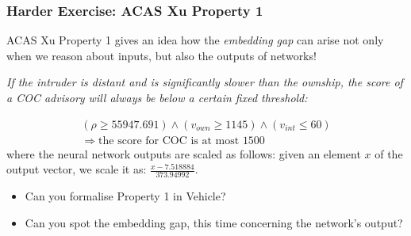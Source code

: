 \documentclass[t,compress,aspectratio=169]{beamer}
\begin{document}
\begin{frame}
\frametitle{Harder Exercise: ACAS Xu Property 1}
\vspace{-2em}
ACAS Xu Property 1 gives an idea how the {\it embedding gap}
 can arise not only when we reason about inputs, but also  the outputs of networks!


\pause

\begin{definition}
\small{\it If the intruder is distant and is significantly slower than the ownship, the score of a COC advisory will always be below a certain fixed threshold:}

\begin{equation*}
\begin{array}{l}
(\rho \geq 55947.691) \wedge
(v_{own} \geq 1145) \wedge (v_{int} \leq 60)  \\
\Rightarrow \text{the score for COC is at most } 1500
\end{array}
\end{equation*}
where the neural network outputs are scaled as follows: given an element $x$ of the output vector, we scale it as: $\frac{x - 7.518884}{373.94992}$.

\pause


\end{definition}

\begin{itemize}
\item Can you formalise Property 1 in Vehicle?
\item Can you spot the embedding gap, this time concerning the network's output?
\end{itemize}
\end{frame}
\end{document}
